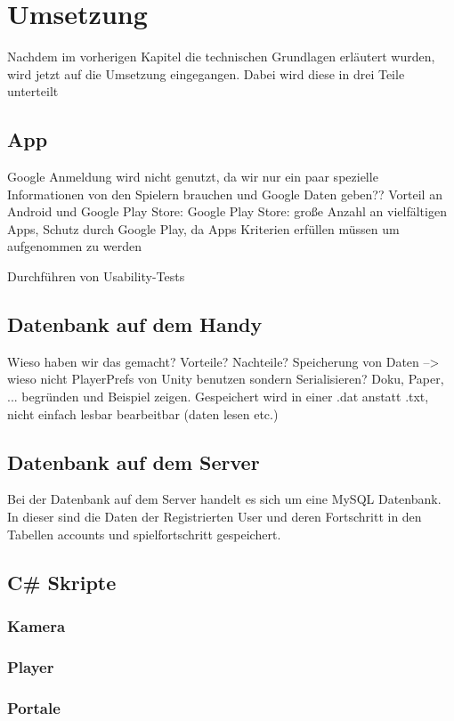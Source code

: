 \chapter{Umsetzung}

Nachdem im vorherigen Kapitel die technischen Grundlagen erläutert wurden, wird jetzt auf die Umsetzung eingegangen. Dabei wird diese in drei Teile unterteilt

\section{App}
Google Anmeldung wird nicht genutzt, da wir nur ein paar spezielle Informationen von den Spielern brauchen und Google Daten geben??
Vorteil an Android und Google Play Store: Google Play Store: große Anzahl an vielfältigen Apps, Schutz durch Google Play, da Apps Kriterien erfüllen müssen um aufgenommen zu werden

		Durchführen von Usability-Tests

\section{Datenbank auf dem Handy}
Wieso haben wir das gemacht? Vorteile? Nachteile?
Speicherung von Daten --> wieso nicht PlayerPrefs von Unity benutzen sondern Serialisieren? Doku, Paper, ... begründen und Beispiel zeigen. Gespeichert wird in einer .dat anstatt .txt, nicht einfach lesbar bearbeitbar (daten lesen etc.)
	
\section{Datenbank auf dem Server}
Bei der Datenbank auf dem Server handelt es sich um eine MySQL Datenbank. In dieser sind die Daten der Registrierten User und deren Fortschritt in den Tabellen accounts und spielfortschritt gespeichert.

\section{C\# Skripte}
\subsection{Kamera}
\subsection{Player}
\subsection{Portale}

